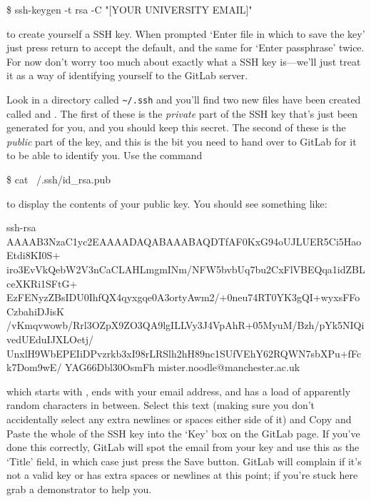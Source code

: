 \begin{ttoutenv}
\$ ssh-keygen -t rsa -C "[YOUR UNIVERSITY EMAIL]"
\end{ttoutenv}

to create yourself a SSH key. When prompted `Enter file in which to save the key' just press return to accept the default, and the same for `Enter passphrase' twice.  For now don't worry too much about exactly what a SSH key is---we'll just treat it as a way of identifying yourself to the GitLab server. 

Look in a directory called \verb!~/.ssh! and you'll find two new files have been created called  and . The first of these is the \textit{private} part of the SSH key that's just been generated for you, and you should keep this secret. The second of these is the \textit{public} part of the key, and this is the bit you need to hand over to GitLab for it to be able to identify you. Use the command

\begin{ttoutenv}
\$ cat ~/.ssh/id_rsa.pub
\end{ttoutenv}
to display the contents of your public key. You should see something like:

\begin{ttoutenv}
  
  ssh-rsa  AAAAB3NzaC1yc2EAAAADAQABAAABAQDTfAF0KxG94oUJLUER5Ci5HaoEtdi8KI0S+
  iro3EvVkQebW2V3nCaCLAHLmgmINm/NFW5bvbUq7bu2CxFlVBEQqa1idZBLceXKRi1SFtG+
  EzFENyzZBsIDU0IhfQX4qyxgqe0A3ortyAwm2/+0neu74RT0YK3gQI+wyxsFFoCzbahiDJisK
  /vKmqvwowb/Rrl3OZpX9ZO3QA9lgILLVy3J4VpAhR+05MyuM/Bzh/pYk5NIQivedUEduIJXLOetj/
  UnxlH9WbEPEIiDPvzrkb3xI98rLRSlh2hH89nc1SUfVEhY62RQWN7sbXPu+fFck7Dom9wE/
  YAG66Dbl30OsmFh mister.noodle@manchester.ac.uk

\end{ttoutenv}

which starts with , ends with your email address, and has a load of apparently random characters in between. Select this text (making sure you don't accidentally select any extra newlines or spaces either side of it) and 
Copy and Paste the whole of the SSH key into the `Key' box on the GitLab page. If you've done this correctly, GitLab will spot the email from your key and use this as the `Title' field, in which case just press the Save button. GitLab will complain if it's not a valid key or has extra spaces or newlines at this point; if you're stuck here grab a demonstrator to help you. 

